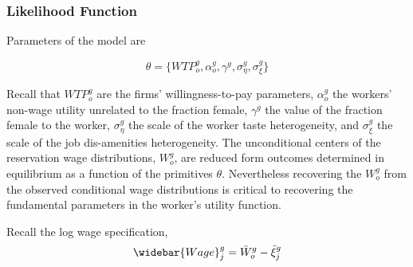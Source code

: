 \documentclass[11pt]{article}
\begin{document}




\subsubsection{Likelihood Function}

Parameters of the model are

$$ \theta = \{ WTP^g_o,  \alpha^g_o, \gamma^g, \sigma^g_\eta, \sigma^g_\xi  \} $$

Recall that $WTP^g_o$ are the firms' willingness-to-pay parameters, $\alpha^g_o$ the workers' non-wage utility unrelated to the fraction female, $\gamma^g$ the value of the fraction female to the worker, $\sigma^g_\eta$ the scale of the worker taste heterogeneity, and $\sigma^g_\xi$ the scale of the job dis-amenities heterogeneity. The unconditional centers of the reservation wage distributions, $W^g_o$, are reduced form outcomes determined in equilibrium as a function of the primitives $\theta$. Nevertheless recovering the $W^g_o$ from the observed conditional wage distributions is critical to recovering the fundamental parameters in the worker's utility function.


Recall the log wage specification, $$ \widebar{Wage}^g_j = \bar{W}^g_o -  \bar{\xi}^g_j $$

\end{document}
